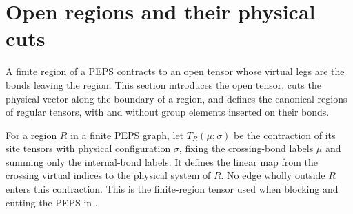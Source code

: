 \section{Open regions and their physical cuts}%
\label{sec:peps_open_regions}

A finite region of a PEPS contracts to an open tensor whose virtual legs are
the bonds leaving the region. This section introduces the open tensor, cuts
the physical vector along the boundary of a region, and defines the canonical
regions of regular tensors, with and without group elements inserted on their
bonds.

\begin{definition}%
    \label{def:peps_open_region_contraction}
    \leanok
    For a region $R$ in a finite PEPS graph, let $T_R(\mu;\sigma)$ be
    the contraction of its site tensors with physical configuration
    $\sigma$, fixing the crossing-bond labels $\mu$ and summing only
    the internal-bond labels. It defines the linear map from the
    crossing virtual indices to the physical system of $R$.
    No edge wholly outside $R$ enters this contraction. This is the
    finite-region tensor used when blocking and cutting the PEPS in
    \cite[Section~6, proof of Theorem~6.9]{Schuch2010PEPS}.
\end{definition}

